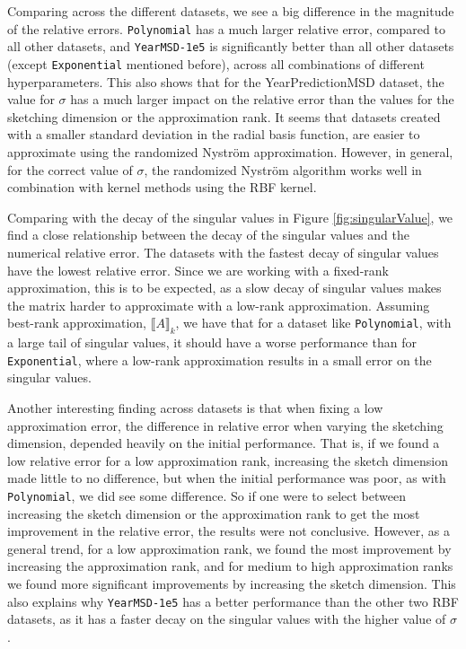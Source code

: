 \documentclass{article}
\theoremstyle{definition}
\begin{document}
Comparing across the different datasets, we see a big difference in the
magnitude of the relative errors. \texttt{Polynomial} has a much larger relative
error, compared to all other datasets, and \texttt{YearMSD-1e5} is significantly
better than all other datasets (except \texttt{Exponential} mentioned before),
across all combinations of different hyperparameters. This also shows that for
the YearPredictionMSD dataset, the value for $\sigma$ has a much larger impact
on the relative error than the values for the sketching dimension or the
approximation rank. It seems that datasets created with a smaller standard
deviation in the radial basis function, are easier to approximate using the
randomized Nyström approximation. However, in general, for the correct value of
$\sigma$, the randomized Nyström algorithm works well in combination with kernel
methods using the RBF kernel. \newline

Comparing with the decay of the singular values in Figure
\ref{fig:singularValue}, we find a close relationship between the decay of the
singular values and the numerical relative error. The datasets with the fastest
decay of singular values have the lowest relative error. Since we are working
with a fixed-rank approximation, this is to be expected, as a slow decay of
singular values makes the matrix harder to approximate with a low-rank
approximation. Assuming best-rank approximation, $\llbracket A\rrbracket_k$, we
have that for a dataset like \texttt{Polynomial}, with a large tail of singular
values, it should have a worse performance than for \texttt{Exponential}, where
a low-rank approximation results in a small error on the singular
values.\newline

Another interesting finding across datasets is that when fixing a low
approximation error, the difference in relative error when varying the sketching
dimension, depended heavily on the initial performance. That is, if we found a
low relative error for a low approximation rank, increasing the sketch dimension
made little to no difference, but when the initial performance was poor, as with
\texttt{Polynomial}, we did see some difference. So if one were to select
between increasing the sketch dimension or the approximation rank to get the
most improvement in the relative error, the results were not conclusive.
However, as a general trend, for a low approximation rank, we found the most
improvement by increasing the approximation rank, and for medium to high
approximation ranks we found more significant improvements by increasing the
sketch dimension. This also explains why \texttt{YearMSD-1e5} has a better
performance than the other two RBF datasets, as it has a faster decay on the
singular values with the higher value of $\sigma$.\newline
\end{document}

